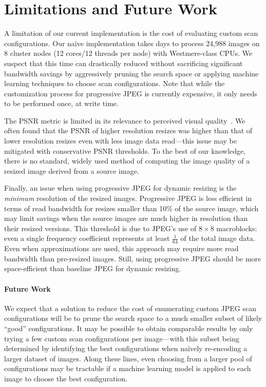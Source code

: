 \section{Limitations and Future Work}
A limitation of our current implementation is the cost of evaluating custom scan configurations.
Our na\"{i}ve implementation takes days to process 24,988 images on 8 cluster nodes (12 cores/12 threads per node) with Westmere-class CPUs. 
We suspect that this time can drastically reduced without sacrificing significant bandwidth savings by aggressively pruning the search space or applying machine learning techniques to choose scan configurations.
Note that while the customization process for progressive JPEG is currently expensive, it only needs to be performed once, at write time. 

The PSNR metric is limited in its relevance to perceived visual quality~\cite{wang2002no}.
We often found that the PSNR of higher resolution resizes was higher than that of lower resolution resizes even with less image data read---this issue may be mitigated with conservative PSNR thresholds.
To the best of our knowledge, there is no standard, widely used method of computing the image quality of a resized image derived from a source image.

Finally, an issue when using progressive JPEG for dynamic resizing is the \emph{minimum} resolution of the resized images.
Progressive JPEG is less efficient in terms of read bandwidth for resizes smaller than 10\% of the source image, which may limit savings when the source images are much higher in resolution than their resized versions.
This threshold is due to JPEG's use of $8\times8$ macroblocks: even a single frequency coefficient represents at least $\frac{1}{64}$ of the total image data.
Even when approximations are used, this approach may require more read bandwidth than pre-resized images.
Still, using progressive JPEG should be more space-efficient than baseline JPEG for dynamic resizing.

\paragraph{Future Work}
We expect that a solution to reduce the cost of enumerating custom JPEG scan configurations will be to prune the search space to a much smaller subset of likely ``good'' configurations.
It may be possible to obtain comparable results by only trying a few custom scan
configurations per image---with this subset being determined by identifying the best configurations when na\"{i}vely re-encoding a larger dataset of images.
Along these lines, even choosing from a larger pool of configurations may be tractable if a machine learning model is applied to each image to choose the best configuration.
